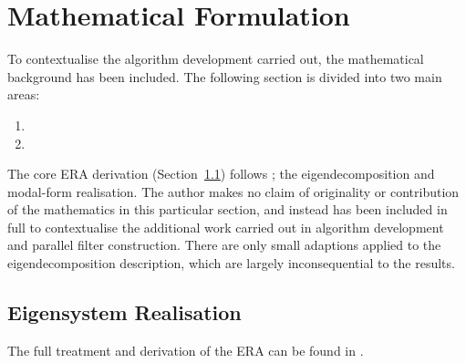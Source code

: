 \section{Mathematical Formulation}
\label{sec:mathematics}
To contextualise the algorithm development carried out, the mathematical background has been included. The following section is divided into two main areas:

\begin{enumerate}
    \item {}
    \item {}
\end{enumerate}

The core ERA derivation (Section~\ref{sec:era-proof}) follows \cite{dafx2026}; the eigendecomposition and modal-form realisation. The author makes no claim of originality or contribution of the mathematics in this particular section, and instead has been included in full to contextualise the additional work carried out in algorithm development and parallel filter construction. There are only small adaptions applied to the eigendecomposition description, which are largely inconsequential to the results.

\subsection{Eigensystem Realisation}
\label{sec:era-proof}

The full treatment and derivation of the ERA can be found in \cite{juang-1994-book}.

